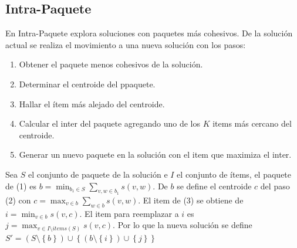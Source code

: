 \subsection{Intra-Paquete}
En Intra-Paquete explora soluciones con paquetes más cohesivos. De la solución actual se realiza el movimiento a una nueva solución con los pasos:
\begin{enumerate}
	\item Obtener el paquete menos cohesivos de la solución.
	\item Determinar el centroide del ppaquete.
	\item Hallar el ítem más alejado del centroide.
	\item Calcular el inter del paquete agregando uno de los $K$ items más cercano del centroide.
	\item Generar un nuevo paquete en la solución con el item que maximiza el inter.
\end{enumerate}

Sea $S$ el conjunto de paquete de la solución e $I$ el conjunto de ítems, el paquete de (1) es $b = \min_{b_1 \in S}{\sum_{v,w \in b_1}{s(v,w)}}$. De $b$ se define el centroide $c$ del paso (2) con $c = \max_{v \in b}{\sum_{w \in b}{s(v,w)}}$. El item de (3) se obtiene de $i = \min_{v \in b}{s(v,c)}$. El item para reemplazar a $i$ es $j = \max_{v \in I \setminus items(S)}{s(v,c)}$. Por lo que la nueva solución se define $S' = (S \setminus \left\{b\right\}) \cup \left\{(b \setminus \left\{i\right\})\cup\left\{j\right\}\right\}$

